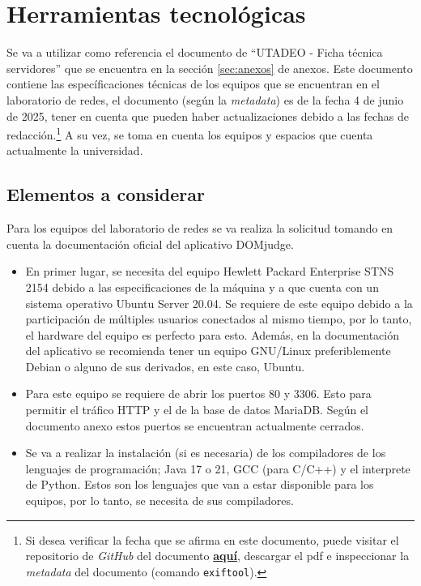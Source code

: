 \documentclass{article}
\begin{document}
\section{Herramientas tecnológicas}

Se va a utilizar como referencia el documento de ``UTADEO - Ficha técnica servidores'' que se encuentra en la sección \ref{sec:anexos} de anexos. Este documento contiene las específicaciones técnicas de los equipos que se encuentran en el laboratorio de redes, el documento (según la \textit{metadata}) es de la fecha 4 de junio de 2025, tener en cuenta que pueden haber actualizaciones debido a las fechas de redacción.\footnote{ Si desea verificar la fecha que se afirma en este documento, puede visitar el repositorio de \textit{GitHub} del documento \href{https://github.com/SegmentationFaultUtadeo/PropuestaMaratonUtadeo/blob/main/Bibliografia/FichaTecnica.pdf}{\textbf{aquí}}, descargar el pdf e inspeccionar la \textit{metadata} del documento (comando \texttt{exiftool}\cite{exiftool}).} A su vez, se toma en cuenta los equipos y espacios que cuenta actualmente la universidad.


\subsection{Elementos a considerar}

Para los equipos del laboratorio de redes se va realiza la solicitud tomando en cuenta la documentación oficial del aplicativo DOMjudge\cite{domjudge-docs}.

\begin{itemize}
  \item En primer lugar, se necesita del equipo Hewlett Packard Enterprise STNS 2154 debido a las especificaciones de la máquina y a que cuenta con un sistema operativo Ubuntu Server 20.04. Se requiere de este equipo debido a la participación de múltiples usuarios conectados al mismo tiempo, por lo tanto, el hardware del equipo es perfecto para esto. Además, en la documentación del aplicativo se recomienda tener un equipo GNU/Linux preferiblemente Debian o alguno de sus derivados, en este caso, Ubuntu.
  \item Para este equipo se requiere de abrir los puertos \(80\) y \(3306\). Esto para permitir el tráfico HTTP y el de la base de datos MariaDB. Según el documento anexo estos puertos se encuentran actualmente cerrados.
  \item Se va a realizar la instalación (si es necesaria) de los compiladores de los lenguajes de programación; Java 17\cite{oracle-java} o 21, GCC\cite{gcc} (para C/C++) y el interprete de Python\cite{python-downloads}. Estos son los lenguajes que van a estar disponible para los equipos, por lo tanto, se necesita de sus compiladores.
\end{itemize}
\end{document}
